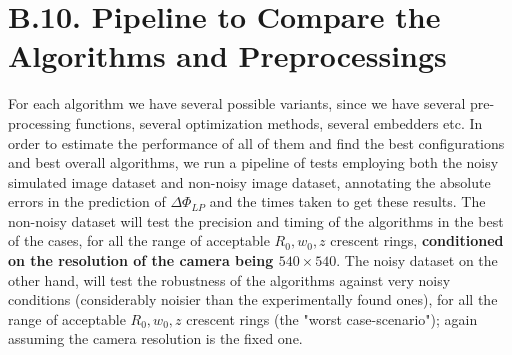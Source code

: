 \documentclass[11pt, a4paper, twoside]{article} %
\begin{document}

\section*{B.10. Pipeline to Compare the Algorithms and Preprocessings}
\vspace{-0.3cm}
For each algorithm we have several possible variants, since we have several pre-processing functions, several optimization methods, several embedders etc. In order to estimate the performance of all of them and find the best configurations and best overall algorithms, we run a pipeline of tests employing both the noisy simulated image dataset and non-noisy image dataset, annotating the absolute errors in the prediction of $\Delta\Phi_{LP}$ and the times taken to get these results. The non-noisy dataset will test the precision and timing of the algorithms in the best of the cases, for all the range of acceptable $R_0,w_0,z$ crescent rings, {\bf conditioned on the resolution of the camera being $540\times 540$}. The noisy dataset on the other hand, will test the robustness of the algorithms against very noisy conditions (considerably noisier than the experimentally found ones), for all the range of acceptable $R_0,w_0,z$ crescent rings (the "worst case-scenario"); again assuming the camera resolution is the fixed one.
\end{document}
